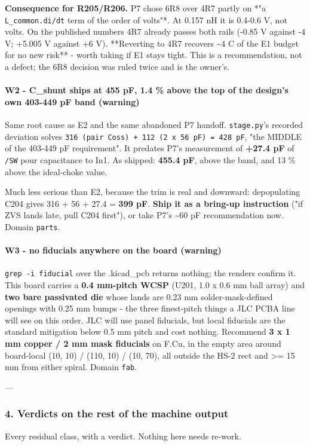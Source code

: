 \documentclass[11pt,a4paper]{article}
\begin{document}
\textbf{Consequence for R205/R206.} P7 chose 6R8 over 4R7 partly on {*}"a \texttt{L\_common.di/dt} term of the order of volts"{*}. At 0.157 nH it is 0.4-0.6 V, not volts. On the published numbers 4R7 already passes both rails (-0.85 V against -4 V; +5.005 V against +6 V). {*}{*}Reverting to 4R7 recovers \textasciitilde{}4 C of the E1 budget for no new risk{*}{*} - worth taking if E1 stays tight. This is a recommendation, not a defect; the 6R8 decision was ruled twice and is the owner's.

\paragraph*{W2 - C\_shunt ships at 455 pF, 1.4 \% above the top of the design's own 403-449 pF band (warning)}
Same root cause as E2 and the same abandoned P7 handoff. \texttt{stage.py}'s recorded deviation solves \texttt{316 (pair Coss) + 112 (2 x 56 pF) = 428 pF}, "the MIDDLE of the 403-449 pF requirement". It predates P7's measurement of \textbf{+27.4 pF} of \texttt{/SW} pour capacitance to In1. As shipped: \textbf{455.4 pF}, above the band, and 13 \% above the ideal-choke value.

Much less serious than E2, because the trim is real and downward: depopulating C204 gives 316 + 56 + 27.4 = \textbf{399 pF}. \textbf{Ship it as a bring-up instruction} ("if ZVS lands late, pull C204 first"), or take P7's \textasciitilde{}60 pF recommendation now. Domain \texttt{parts}.

\paragraph*{W3 - no fiducials anywhere on the board (warning)}
\texttt{grep -i fiducial} over the .kicad\_pcb returns nothing; the renders confirm it. This board carries a \textbf{0.4 mm-pitch WCSP} (U201, 1.0 x 0.6 mm ball array) and \textbf{two bare passivated die} whose lands are 0.23 mm solder-mask-defined openings with 0.25 mm bumps - the three finest-pitch things a JLC PCBA line will see on this order. JLC will use panel fiducials, but local fiducials are the standard mitigation below 0.5 mm pitch and cost nothing. Recommend \textbf{3 x 1 mm copper / 2 mm mask fiducials} on F.Cu, in the empty area around board-local (10, 10) / (110, 10) / (10, 70), all outside the HS-2 rect and \textgreater{}= 15 mm from either spiral. Domain \texttt{fab}.

---

\subsubsection*{4. Verdicts on the rest of the machine output}
Every residual class, with a verdict. Nothing here needs re-work.
\end{document}
